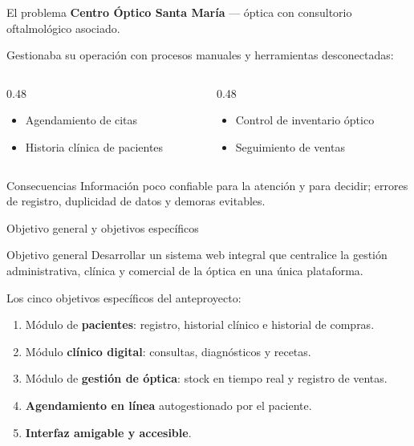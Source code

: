 \documentclass[11pt,aspectratio=169]{beamer}
\begin{document}
\begin{frame}{El problema}
  \textbf{Centro Óptico Santa María} --- óptica con consultorio oftalmológico asociado.

  \vspace{8pt}
  Gestionaba su operación con \alert{procesos manuales y herramientas desconectadas}:

  \vspace{6pt}
  \begin{columns}[T,onlytextwidth]
    \begin{column}{0.48\textwidth}
      \begin{itemize}
        \item Agendamiento de citas
        \item Historia clínica de pacientes
      \end{itemize}
    \end{column}
    \begin{column}{0.48\textwidth}
      \begin{itemize}
        \item Control de inventario óptico
        \item Seguimiento de ventas
      \end{itemize}
    \end{column}
  \end{columns}

  \vspace{12pt}
  \begin{block}{Consecuencias}
    Información poco confiable para la atención y para decidir; errores de registro,
    duplicidad de datos y demoras evitables.
  \end{block}
\end{frame}

\begin{frame}{Objetivo general y objetivos específicos}
  \begin{block}{Objetivo general}
    Desarrollar un sistema web integral que centralice la gestión administrativa,
    clínica y comercial de la óptica en una única plataforma.
  \end{block}

  \vspace{6pt}
  {\small Los cinco objetivos específicos del anteproyecto:}
  \vspace{2pt}
  \begin{enumerate}
    \item Módulo de \textbf{pacientes}: registro, historial clínico e historial de compras.
    \item Módulo \textbf{clínico digital}: consultas, diagnósticos y recetas.
    \item Módulo de \textbf{gestión de óptica}: stock en tiempo real y registro de ventas.
    \item \textbf{Agendamiento en línea} autogestionado por el paciente.
    \item \textbf{Interfaz amigable y accesible}.
  \end{enumerate}
\end{frame}
\end{document}
